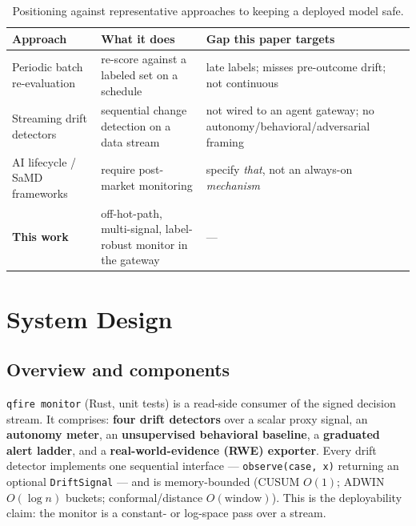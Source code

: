 \documentclass[11pt]{article}
\begin{document}
\begin{table}[htb]\centering\small
\begin{tabular}{L{3.2cm}L{4.3cm}L{4.3cm}}
\toprule
Approach & What it does & Gap this paper targets \\
\midrule
Periodic batch re-evaluation~\cite{finlayson2021clinician} & re-score against a labeled set on a schedule & late labels; misses pre-outcome drift; not continuous \\
Streaming drift detectors~\cite{page1954cusum,bifet2007adwin,volkhonskiy2017conformal} & sequential change detection on a data stream & not wired to an agent gateway; no autonomy/behavioral/adversarial framing \\
AI lifecycle / SaMD frameworks~\cite{fda2021samd,schwoebel2026haarf} & require post-market monitoring & specify \emph{that}, not an always-on \emph{mechanism} \\
\textbf{This work} & off-hot-path, multi-signal, label-robust monitor in the gateway & --- \\
\bottomrule
\end{tabular}
\caption{Positioning against representative approaches to keeping a deployed model safe.}
\label{tab:related}
\end{table}

\section{System Design}\label{sec:design}
\subsection{Overview and components}
\texttt{qfire monitor} (Rust, \MonitorTests{} unit tests) is a read-side consumer of the
signed decision stream. It comprises: \textbf{four drift detectors} over a scalar proxy
signal, an \textbf{autonomy meter}, an \textbf{unsupervised behavioral baseline}, a
\textbf{graduated alert ladder}, and a \textbf{real-world-evidence (RWE) exporter}. Every
drift detector implements one sequential interface --- \texttt{observe(case, x)} returning
an optional \texttt{DriftSignal} --- and is memory-bounded (CUSUM $O(1)$; ADWIN
$O(\log n)$ buckets; conformal/distance $O(\text{window})$). This is the deployability
claim: the monitor is a constant- or log-space pass over a stream.
\end{document}
